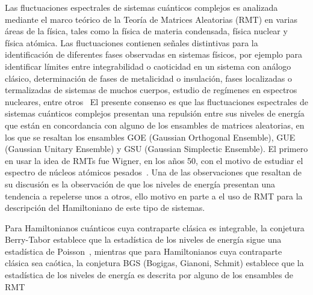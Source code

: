 \documentclass[spanish,titlepage,table]{practicas}
\begin{document}
Las fluctuaciones espectrales de sistemas cuánticos complejos es analizada mediante 
el marco teórico de la Teoría de Matrices Aleatorias (RMT) en varias áreas de la física, 
tales como la física de materia condensada, física nuclear y física atómica.
Las fluctuaciones contienen señales distintivas para la identificación de diferentes fases observadas 
en sistemas físicos, por ejemplo para identificar límites entre integrabilidad o caoticidad en un sistema con análogo clásico,
determinación de fases de metalicidad o insulación, fases localizadas o termalizadas de sistemas de muchos cuerpos, estudio de regímenes en espectros nucleares, entre otros~\cite{Tekur2020}
El presente consenso es que las fluctuaciones espectrales de sistemas cuánticos complejos presentan 
una repulsión entre sus niveles de energía que están en concordancia con alguno de los ensambles de matrices 
aleatorias, en los que se resaltan los ensambles GOE (Gaussian Orthogonal Ensemble), GUE (Gaussian Unitary Ensemble) y GSU (Gaussian Simplectic Ensemble).
El primero en usar la idea de RMTs fue Wigner, en los años 50, con el motivo de estudiar el espectro de núcleos atómicos pesados~\cite{Wigner1955}.
Una de las observaciones que resaltan de su discusión es la observación de que los niveles de energía presentan una tendencia a repelerse unos a otros, 
ello motivo en parte a el uso de RMT para la descripción del Hamiltoniano de este tipo de sistemas. 

Para Hamiltonianos cuánticos cuya contraparte clásica es integrable, la conjetura Berry-Tabor establece que 
la estadística de los niveles de energía sigue una estadística de Poisson~\cite{BerryTabor1977}, mientras que para Hamiltonianos 
cuya contraparte clásica sea caótica, la conjetura BGS (Bogigas, Gianoni, Schmit) establece que la estadística de los niveles de energía es descrita 
por alguno de los ensambles de RMT~\cite{Atas_2013}
\end{document}
